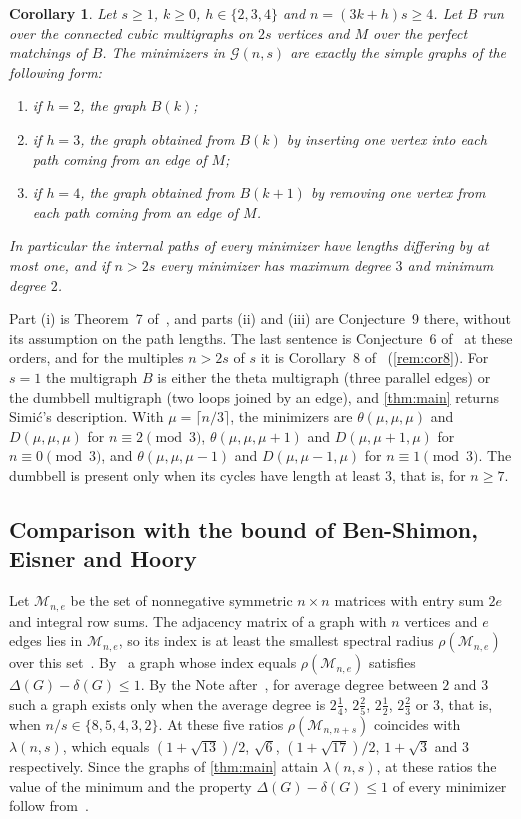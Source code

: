 \documentclass[11pt]{article}
\newtheorem{corollary}[theorem]{Corollary}
\theoremstyle{definition}
\theoremstyle{remark}
\newcommand{\G}{\mathcal{G}}
\begin{document}
\begin{corollary}\label{cor:belardo}
Let $s\ge1$, $k\ge0$, $h\in\{2,3,4\}$ and $n=(3k+h)s\ge4$. Let $B$ run over the connected cubic multigraphs on $2s$
vertices and $M$ over the perfect matchings of $B$. The minimizers in $\G(n,s)$ are exactly the simple
graphs of the following form:
\begin{enumerate}[label=(\roman*)]
\item if $h=2$, the graph $B(k)$;
\item if $h=3$, the graph obtained from $B(k)$ by inserting one vertex into each path coming from an edge of $M$;
\item if $h=4$, the graph obtained from $B(k+1)$ by removing one vertex from each path coming from an edge of $M$.
\end{enumerate}
In particular the internal paths of every minimizer have lengths differing by at most one, and if $n>2s$ every
minimizer has maximum degree $3$ and minimum degree $2$.
\end{corollary}

Part (i) is Theorem~7 of~\cite{Be19}, and parts (ii) and (iii) are Conjecture~9 there, without its assumption on the
path lengths. The last sentence is Conjecture~6 of~\cite{Be19} at these orders, and for the multiples $n>2s$ of $s$ it is
Corollary~8 of~\cite{Be19} (\cref{rem:cor8}). For $s=1$ the multigraph $B$ is either the theta
multigraph (three parallel edges) or the dumbbell multigraph (two loops joined by an edge), and \cref{thm:main} returns
Simi\'c's description. With $\mu=\lceil n/3\rceil$, the minimizers are $\theta(\mu,\mu,\mu)$ and $D(\mu,\mu,\mu)$ for
$n\equiv2\pmod 3$, $\theta(\mu,\mu,\mu+1)$ and $D(\mu,\mu+1,\mu)$ for $n\equiv0\pmod3$, and $\theta(\mu,\mu,\mu-1)$ and
$D(\mu,\mu-1,\mu)$ for $n\equiv1\pmod3$. The dumbbell is present only when its cycles have length at least $3$, that
is, for $n\ge7$.

\subsection{Comparison with the bound of Ben-Shimon, Eisner and Hoory}\label{sec:beh}

Let $\mathcal M_{n,e}$ be the set of nonnegative symmetric $n\times n$ matrices with entry sum $2e$ and integral row sums. The adjacency matrix of a graph
with $n$ vertices and $e$ edges lies in $\mathcal M_{n,e}$, so its index is at least the smallest spectral radius
$\rho(\mathcal M_{n,e})$ over this set~\cite{BEH}. By~\cite[Theorem~1.5]{BEH} a graph whose index equals
$\rho(\mathcal M_{n,e})$ satisfies $\Delta(G)-\delta(G)\le1$. By the Note after~\cite[Theorem~1.7]{BEH}, for average
degree between $2$ and $3$ such a graph exists only when the average degree is $2\frac14$, $2\frac25$, $2\frac12$,
$2\frac23$ or $3$, that is, when $n/s\in\{8,5,4,3,2\}$. At these five ratios $\rho(\mathcal M_{n,n+s})$ coincides with
$\lambda(n,s)$, which equals $(1+\sqrt{13})/2$, $\sqrt6$, $(1+\sqrt{17})/2$, $1+\sqrt3$ and $3$ respectively. Since
the graphs of \cref{thm:main} attain $\lambda(n,s)$, at these ratios the value of the minimum and the property
$\Delta(G)-\delta(G)\le1$ of every minimizer follow from~\cite{BEH}.
\end{document}
